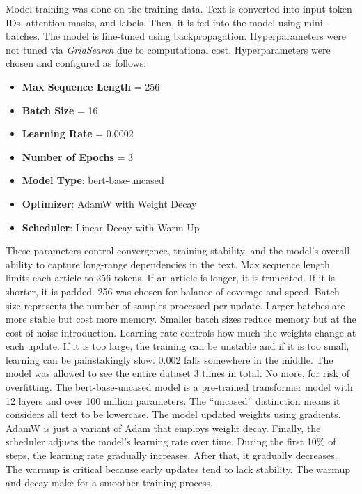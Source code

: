 \documentclass{article}
\begin{document}
Model training was done on the training data. Text is converted into input token IDs, attention masks, and labels. Then, it is fed into the model using mini-batches. The model is fine-tuned using backpropagation. Hyperparameters were not tuned via {\it GridSearch} due to computational cost. Hyperparameters were chosen and configured as follows:

\begin{itemize}

    \item \textbf{Max Sequence Length} = 256

    \item \textbf{Batch Size} = 16

    \item \textbf{Learning Rate} = 0.0002

    \item \textbf{Number of Epochs} = 3

    \item \textbf{Model Type}: bert-base-uncased

    \item \textbf{Optimizer}: AdamW with Weight Decay

    \item \textbf{Scheduler}: Linear Decay with Warm Up

\end{itemize}

These parameters control convergence, training stability, and the model’s overall ability to capture long-range dependencies in the text. Max sequence length limits each article to 256 tokens. If an article is longer, it is truncated. If it is shorter, it is padded. 256 was chosen for balance of coverage and speed. Batch size represents the number of samples processed per update. Larger batches are more stable but cost more memory. Smaller batch sizes reduce memory but at the cost of noise introduction. Learning rate controls how much the weights change at each update. If it is too large, the training can be unstable and if it is too small, learning can be painstakingly slow. 0.002 falls somewhere in the middle. The model was allowed to see the entire dataset 3 times in total. No more, for risk of overfitting. The bert-base-uncased model is a pre-trained transformer model with 12 layers and over 100 million parameters. The “uncased” distinction means it considers all text to be lowercase. The model updated weights using gradients. AdamW is just a variant of Adam that employs weight decay. Finally, the scheduler adjusts the model’s learning rate over time. During the first 10\% of steps, the learning rate gradually increases. After that, it gradually decreases. The warmup is critical because early updates tend to lack stability. The warmup and decay make for a smoother training process. 
\end{document}
